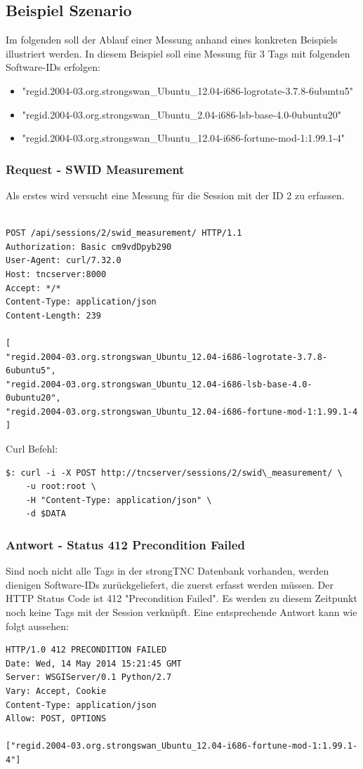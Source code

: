 \documentclass[10pt,a4paper]{scrartcl}
\begin{document}
\subsection{Beispiel Szenario}
Im folgenden soll der Ablauf einer Messung anhand eines konkreten Beispiels illustriert werden. In diesem Beispiel soll eine Messung für 3 Tags mit folgenden Software-IDs erfolgen:
\begin{itemize}
\item "regid.2004-03.org.strongswan\_Ubuntu\_12.04-i686-logrotate-3.7.8-6ubuntu5"
\item "regid.2004-03.org.strongswan\_Ubuntu\_2.04-i686-lsb-base-4.0-0ubuntu20"
\item "regid.2004-03.org.strongswan\_Ubuntu\_12.04-i686-fortune-mod-1:1.99.1-4"
\end{itemize}

\subsubsection{Request - SWID Measurement}
Als erstes wird versucht eine Messung für die Session mit der ID 2 zu erfassen. \hfill
\begin{lstlisting}

POST /api/sessions/2/swid_measurement/ HTTP/1.1
Authorization: Basic cm9vdDpyb290
User-Agent: curl/7.32.0
Host: tncserver:8000
Accept: */*
Content-Type: application/json
Content-Length: 239

[
"regid.2004-03.org.strongswan_Ubuntu_12.04-i686-logrotate-3.7.8-6ubuntu5",
"regid.2004-03.org.strongswan_Ubuntu_12.04-i686-lsb-base-4.0-0ubuntu20",
"regid.2004-03.org.strongswan_Ubuntu_12.04-i686-fortune-mod-1:1.99.1-4
]

\end{lstlisting}

Curl Befehl:
\begin{lstlisting}
$: curl -i -X POST http://tncserver/sessions/2/swid\_measurement/ \
	-u root:root \
	-H "Content-Type: application/json" \
	-d $DATA
\end{lstlisting}
\subsubsection{Antwort - Status 412 Precondition Failed}
Sind noch nicht alle Tags in der strongTNC Datenbank vorhanden, werden dienigen Software-IDs zurückgeliefert, die zuerst erfasst werden müssen. Der HTTP Status Code ist 412 "Precondition Failed". Es werden zu diesem Zeitpunkt noch keine Tags mit der Session verknüpft. Eine entsprechende Antwort kann wie folgt aussehen:
\begin{lstlisting}
HTTP/1.0 412 PRECONDITION FAILED
Date: Wed, 14 May 2014 15:21:45 GMT
Server: WSGIServer/0.1 Python/2.7
Vary: Accept, Cookie
Content-Type: application/json
Allow: POST, OPTIONS

["regid.2004-03.org.strongswan_Ubuntu_12.04-i686-fortune-mod-1:1.99.1-4"]
\end{lstlisting}
\end{document}
